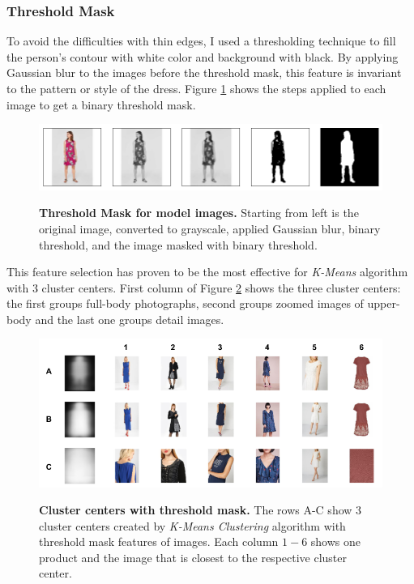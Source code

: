 \documentclass[12pt]{report}
\begin{document}
\subsubsection{Threshold Mask}
To avoid the difficulties with thin edges, I used a thresholding technique to fill the person's contour with white color and background with black. By applying Gaussian blur to the images before the threshold mask, this feature is invariant to the pattern or style of the dress. Figure \ref{fig:cluster_outline_data} shows the steps applied to each image to get a binary threshold mask.

\begin{figure}[h]
\centering
{\includegraphics[width=\linewidth]{04_experiments/clustering/outlines_data}}
\caption{\label{fig:cluster_outline_data} \textbf{Threshold Mask for model images.} Starting from left is the original image, converted to grayscale, applied Gaussian blur, binary threshold, and the image masked with binary threshold.}
\end{figure}

This feature selection has proven to be the most effective for \textit{K-Means} algorithm with 3 cluster centers. First column of Figure \ref{fig:cluster_outline} shows the three cluster centers: the first groups full-body photographs, second groups zoomed images of upper-body and the last one groups detail images. 

\begin{figure}[h]
\centering
{\includegraphics[width=\linewidth]{04_experiments/clustering/outlines_clusters}}
\caption{\label{fig:cluster_outline} \textbf{Cluster centers with threshold mask.} The rows A-C show 3 cluster centers created by \textit{K-Means Clustering} algorithm with threshold mask features of images. Each column $1-6$ shows one product and the image that is closest to the respective cluster center.}
\end{figure}
\end{document}
